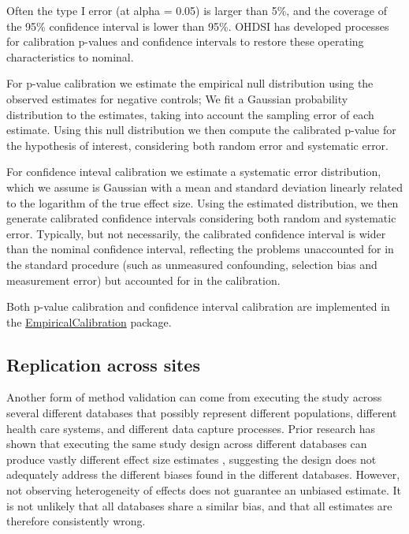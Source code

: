 \documentclass[]{book}
\begin{document}
Often the type I error (at alpha = 0.05) is larger than 5\%, and the
coverage of the 95\% confidence interval is lower than 95\%. OHDSI has
developed processes for calibration p-values and confidence intervals to
restore these operating characteristics to nominal.

For p-value calibration \citep{schuemie_2014} we estimate the empirical
null distribution using the observed estimates for negative controls; We
fit a Gaussian probability distribution to the estimates, taking into
account the sampling error of each estimate. Using this null
distribution we then compute the calibrated p-value for the hypothesis
of interest, considering both random error and systematic error.

For confidence inteval calibration \citep{schuemie_2018} we estimate a
systematic error distribution, which we assume is Gaussian with a mean
and standard deviation linearly related to the logarithm of the true
effect size. Using the estimated distribution, we then generate
calibrated confidence intervals considering both random and systematic
error. Typically, but not necessarily, the calibrated confidence
interval is wider than the nominal confidence interval, reflecting the
problems unaccounted for in the standard procedure (such as unmeasured
confounding, selection bias and measurement error) but accounted for in
the calibration.

Both p-value calibration and confidence interval calibration are
implemented in the
\href{https://ohdsi.github.io/EmpiricalCalibration/}{EmpiricalCalibration}
package.

\subsection{Replication across sites}\label{replication-across-sites}

Another form of method validation can come from executing the study
across several different databases that possibly represent different
populations, different health care systems, and different data capture
processes. Prior research has shown that executing the same study design
across different databases can produce vastly different effect size
estimates \citep{madigan_2013}, suggesting the design does not
adequately address the different biases found in the different
databases. However, not observing heterogeneity of effects does not
guarantee an unbiased estimate. It is not unlikely that all databases
share a similar bias, and that all estimates are therefore consistently
wrong.
\end{document}
